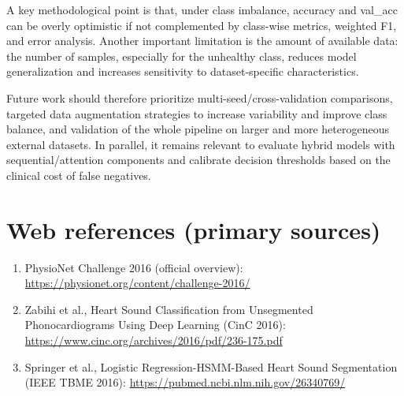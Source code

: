 \documentclass[12pt,a4paper]{article}
\begin{document}
A key methodological point is that, under class imbalance, accuracy and val\_acc can be
overly optimistic if not complemented by class-wise metrics, weighted F1, and error
analysis. Another important limitation is the amount of available data: the number of
samples, especially for the unhealthy class, reduces model generalization and increases
sensitivity to dataset-specific characteristics.

Future work should therefore prioritize multi-seed/cross-validation comparisons, targeted
data augmentation strategies to increase variability and improve class balance, and
validation of the whole pipeline on larger and more heterogeneous external datasets. In
parallel, it remains relevant to evaluate hybrid models with sequential/attention
components and calibrate decision thresholds based on the clinical cost of false negatives.

\section*{Web references (primary sources)}
\begin{enumerate}[leftmargin=*,label=\arabic*.]
    \item PhysioNet Challenge 2016 (official overview): \url{https://physionet.org/content/challenge-2016/}
    \item Zabihi et al., Heart Sound Classification from Unsegmented Phonocardiograms Using Deep Learning (CinC 2016): \url{https://www.cinc.org/archives/2016/pdf/236-175.pdf}
    \item Springer et al., Logistic Regression-HSMM-Based Heart Sound Segmentation (IEEE TBME 2016): \url{https://pubmed.ncbi.nlm.nih.gov/26340769/}
\end{enumerate}
\end{document}
